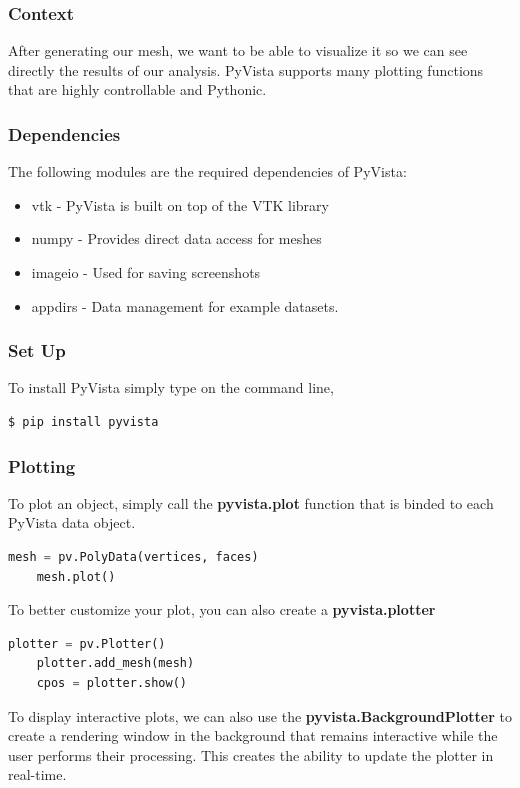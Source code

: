 \documentclass[onecolumn, draftclsnofoot,10pt, compsoc]{IEEEtran}
\begin{document}
\subsubsection{Context}
After generating our mesh, we want to be able to visualize it so we can see directly the results of our analysis. PyVista supports many plotting functions that are highly controllable and Pythonic.
\subsubsection{Dependencies}
The following modules are the required dependencies of PyVista:
\begin{itemize}
    \item vtk - PyVista is built on top of the VTK library
    \item numpy - Provides direct data access for meshes
    \item imageio - Used for saving screenshots
    \item appdirs - Data management for example datasets.
\end{itemize}
\subsubsection{Set Up}
To install PyVista simply type on the command line,
\begin{lstlisting}[language=bash]
  $ pip install pyvista
\end{lstlisting}
\subsubsection{Plotting}
To plot an object, simply call the \textbf{pyvista.plot} function that is binded to each PyVista data object.

\begin{lstlisting}[language=python]
    mesh = pv.PolyData(vertices, faces)
    mesh.plot()
\end{lstlisting}

\noindent
To better customize your plot, you can also create a \textbf{pyvista.plotter}

\begin{lstlisting}[language=python]
    plotter = pv.Plotter()
    plotter.add_mesh(mesh)
    cpos = plotter.show() 
\end{lstlisting}

\noindent
To display interactive plots, we can also use the \textbf{pyvista.BackgroundPlotter} to create a rendering window in the background that remains interactive while the user performs their processing. This creates the ability to update the plotter in real-time.
\end{document}

